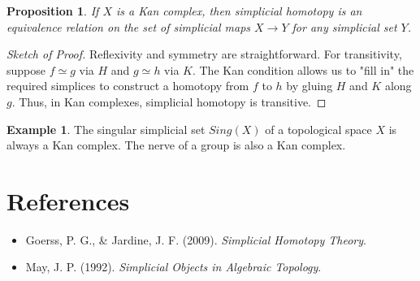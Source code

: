 \documentclass[11pt]{article}
\theoremstyle{definition}
\newtheorem{example}[definition]{Example}
\theoremstyle{plain}
\newtheorem{proposition}[definition]{Proposition}
\begin{document}
\begin{proposition}
    If $X$ is a Kan complex, then simplicial homotopy is an equivalence relation on the set of simplicial maps $X \to Y$ for any simplicial set $Y$.
\end{proposition}

\begin{proof}[Sketch of Proof]
    Reflexivity and symmetry are straightforward. For transitivity, suppose $f \simeq g$ via $H$ and $g \simeq h$ via $K$. The Kan condition allows us to "fill in" the required simplices to construct a homotopy from $f$ to $h$ by gluing $H$ and $K$ along $g$. Thus, in Kan complexes, simplicial homotopy is transitive.
\end{proof}

\begin{example}
    The singular simplicial set $Sing(X)$ of a topological space $X$ is always a Kan complex. The nerve of a group is also a Kan complex.
\end{example}







\section{References}
\begin{itemize}
    \item Goerss, P. G., \& Jardine, J. F. (2009). \emph{Simplicial Homotopy Theory}.
    \item May, J. P. (1992). \emph{Simplicial Objects in Algebraic Topology}.
\end{itemize}
\end{document}
